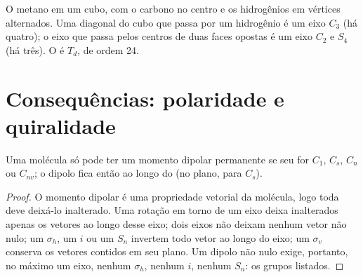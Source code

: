 \begin{omfigure}

{\small O metano em um cubo, com o carbono no centro e os hidrogênios em
vértices alternados. Uma diagonal do cubo que passa por um hidrogênio é um
eixo $C_3$ (há quatro); o eixo que passa pelos centros de duas faces opostas é
um eixo $C_2$ e $S_4$ (há três). O  é $T_d$, de ordem 24.}
\end{omfigure}

\section{Consequências: polaridade e quiralidade}

\begin{theorem}\label{thm:b3:point-groups:polar}
Uma molécula só pode ter um momento dipolar permanente se seu 
for $C_1$, $C_s$, $C_n$ ou $C_{nv}$; o dipolo fica então ao longo do 
(no plano, para $C_s$).
\end{theorem}

\begin{proof}
O momento dipolar é uma propriedade vetorial da molécula, logo toda  deve deixá-lo inalterado. Uma rotação em torno de um eixo deixa
inalterados apenas os vetores ao longo desse eixo; dois eixos não deixam
nenhum vetor não nulo; um $\sigma_h$, um $i$ ou um $S_n$ invertem todo vetor ao
longo do eixo; um $\sigma_v$ conserva os vetores contidos em seu plano. Um
dipolo não nulo exige, portanto, no máximo um eixo, nenhum $\sigma_h$, nenhum $i$,
nenhum $S_n$: os grupos listados.
\end{proof}

